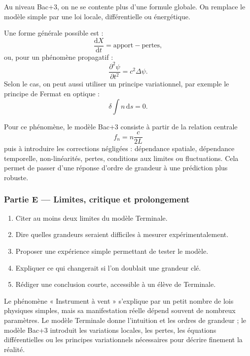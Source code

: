 \documentclass[11pt,a4paper]{article}
\begin{document}
\begin{approfondissementbox}
Au niveau Bac+3, on ne se contente plus d'une formule globale. On remplace le modèle simple par une loi locale, différentielle ou énergétique.

Une forme générale possible est :
\[
\frac{\mathrm d X}{\mathrm dt}=\text{apport}-\text{pertes},
\]
ou, pour un phénomène propagatif :
\[
\frac{\partial^2 \psi}{\partial t^2}=c^2\Delta\psi.
\]
Selon le cas, on peut aussi utiliser un principe variationnel, par exemple le principe de Fermat en optique :
\[
\delta \int n\,\mathrm ds=0.
\]

Pour ce phénomène, le modèle Bac+3 consiste à partir de la relation centrale
\[
f_n=n\frac{c}{2L}
\]
puis à introduire les corrections négligées : dépendance spatiale, dépendance temporelle, non-linéarités, pertes, conditions aux limites ou fluctuations. Cela permet de passer d'une réponse d'ordre de grandeur à une prédiction plus robuste.
\end{approfondissementbox}

\subsubsection*{Partie E — Limites, critique et prolongement}

\begin{enumerate}
  \item Citer au moins deux limites du modèle Terminale.
  \item Dire quelles grandeurs seraient difficiles à mesurer expérimentalement.
  \item Proposer une expérience simple permettant de tester le modèle.
  \item Expliquer ce qui changerait si l'on doublait une grandeur clé.
  \item Rédiger une conclusion courte, accessible à un élève de Terminale.
\end{enumerate}

\begin{corrigebox}
Le phénomène « Instrument à vent » s'explique par un petit nombre de lois physiques simples, mais sa manifestation réelle dépend souvent de nombreux paramètres. Le modèle Terminale donne l'intuition et les ordres de grandeur ; le modèle Bac+3 introduit les variations locales, les pertes, les équations différentielles ou les principes variationnels nécessaires pour décrire finement la réalité.
\end{corrigebox}
\end{document}
